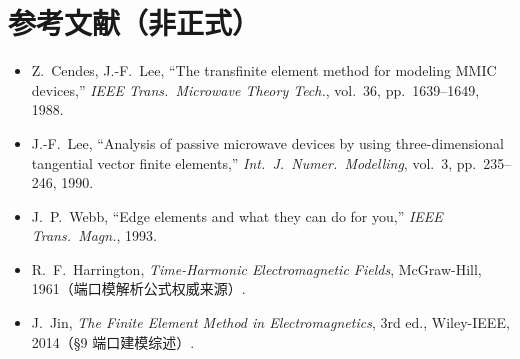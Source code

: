 \documentclass[11pt,a4paper]{ctexart}
\begin{document}
\section{参考文献（非正式）}

\begin{itemize}
\item Z.\ Cendes, J.-F.\ Lee, ``The transfinite element method for modeling MMIC devices,'' \emph{IEEE Trans.\ Microwave Theory Tech.}, vol.\ 36, pp.\ 1639--1649, 1988.
\item J.-F.\ Lee, ``Analysis of passive microwave devices by using three-dimensional tangential vector finite elements,'' \emph{Int.\ J.\ Numer.\ Modelling}, vol.\ 3, pp.\ 235--246, 1990.
\item J.\ P.\ Webb, ``Edge elements and what they can do for you,'' \emph{IEEE Trans.\ Magn.}, 1993.
\item R.\ F.\ Harrington, \emph{Time-Harmonic Electromagnetic Fields}, McGraw-Hill, 1961（端口模解析公式权威来源）.
\item J.\ Jin, \emph{The Finite Element Method in Electromagnetics}, 3rd ed., Wiley-IEEE, 2014（§9 端口建模综述）.
\end{itemize}
\end{document}
